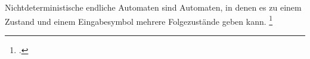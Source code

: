 \documentclass{lehramt-informatik-haupt}
\begin{document}
\begin{center}
\end{center}

Nichtdeterministische endliche Automaten sind Automaten, in denen es zu
einem Zustand und einem Eingabesymbol mehrere Folgezustände geben kann.
\footcite[Seite 28]{vossen}

\literatur
\end{document}

